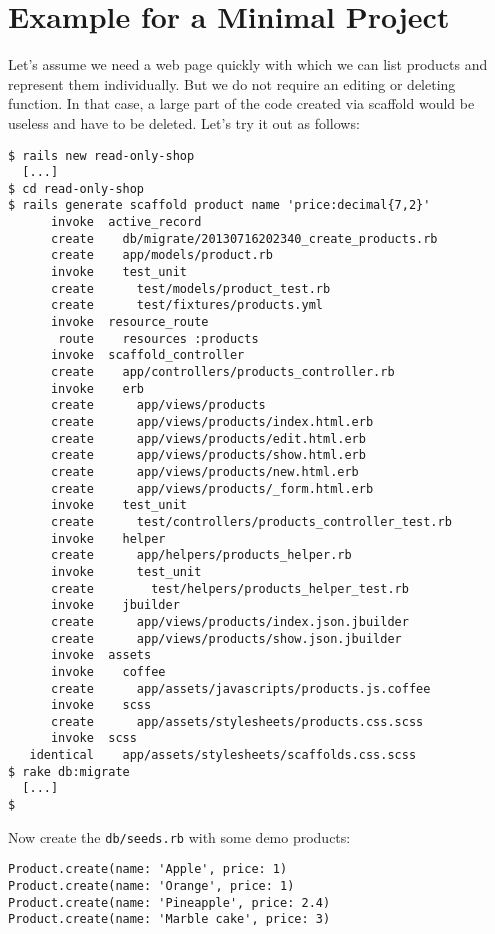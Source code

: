 \documentclass[a4paper]{book}
\begin{document}
\section{Example for a Minimal Project}\label{example-for-a-minimal-project}

Let's assume we need a web page quickly with which we can list products and represent them individually. But we do not require an editing or deleting function. In that case, a large part of the code created via scaffold would be useless and have to be deleted. Let's try it out as follows:

\begin{shaded}\begin{verbatim}
$ rails new read-only-shop
  [...]
$ cd read-only-shop
$ rails generate scaffold product name 'price:decimal{7,2}'
      invoke  active_record
      create    db/migrate/20130716202340_create_products.rb
      create    app/models/product.rb
      invoke    test_unit
      create      test/models/product_test.rb
      create      test/fixtures/products.yml
      invoke  resource_route
       route    resources :products
      invoke  scaffold_controller
      create    app/controllers/products_controller.rb
      invoke    erb
      create      app/views/products
      create      app/views/products/index.html.erb
      create      app/views/products/edit.html.erb
      create      app/views/products/show.html.erb
      create      app/views/products/new.html.erb
      create      app/views/products/_form.html.erb
      invoke    test_unit
      create      test/controllers/products_controller_test.rb
      invoke    helper
      create      app/helpers/products_helper.rb
      invoke      test_unit
      create        test/helpers/products_helper_test.rb
      invoke    jbuilder
      create      app/views/products/index.json.jbuilder
      create      app/views/products/show.json.jbuilder
      invoke  assets
      invoke    coffee
      create      app/assets/javascripts/products.js.coffee
      invoke    scss
      create      app/assets/stylesheets/products.css.scss
      invoke  scss
   identical    app/assets/stylesheets/scaffolds.css.scss
$ rake db:migrate
  [...]
$
\end{verbatim}\end{shaded}

Now create the \texttt{db/seeds.rb} with some demo products:

\begin{shaded}\begin{verbatim}
Product.create(name: 'Apple', price: 1)
Product.create(name: 'Orange', price: 1)
Product.create(name: 'Pineapple', price: 2.4)
Product.create(name: 'Marble cake', price: 3)
\end{verbatim}\end{shaded}
\end{document}
